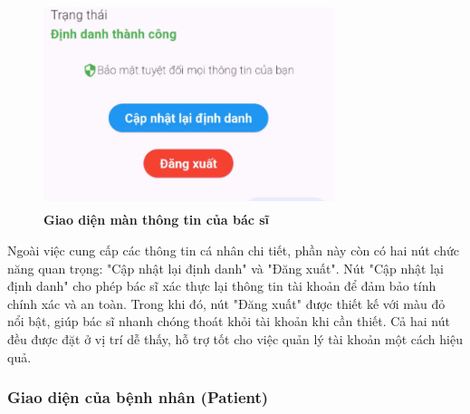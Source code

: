 \begin{figure}[H]
	\centering
	\includegraphics[width=8.5cm,height=6cm]{Images/AppUI/buttonInfoPage.png}
	\caption[Giao diện màn thông tin của bác sĩ]{\bfseries \fontsize{12pt}{0pt}\selectfont Giao diện màn thông tin của bác sĩ}
	\label{infoDoctor}
\end{figure}

Ngoài việc cung cấp các thông tin cá nhân chi tiết, phần này còn có hai nút chức năng quan trọng: "Cập nhật lại định danh" và "Đăng xuất". Nút "Cập nhật lại định danh" cho phép bác sĩ xác thực lại thông tin tài khoản để đảm bảo tính chính xác và an toàn. Trong khi đó, nút "Đăng xuất" được thiết kế với màu đỏ nổi bật, giúp bác sĩ nhanh chóng thoát khỏi tài khoản khi cần thiết. Cả hai nút đều được đặt ở vị trí dễ thấy, hỗ trợ tốt cho việc quản lý tài khoản một cách hiệu quả.
\subsubsection{Giao diện của bệnh nhân (Patient)}

